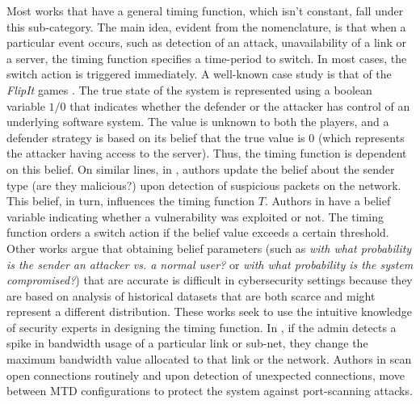Most works that have a general timing function, which isn't constant, fall under this sub-category. The main idea, evident from the nomenclature, is that when a particular event occurs, such as detection of an attack, unavailability of a link or a server, the timing function specifies a time-period to switch. In most cases, the switch action is triggered immediately. 
A well-known case study is that of the \emph{FlipIt} games . The true state of the system is represented using a boolean variable $1/0$ that indicates whether the defender or the attacker has control of an underlying software system. The value is unknown to both the players, and a defender strategy is based on its belief that the true value is $0$ (which represents the attacker having access to the server). Thus, the timing function is dependent on this belief.
On similar lines, in , authors update the belief about the sender type (are they malicious?) upon detection of suspicious packets on the network. This belief, in turn, influences the timing function $T$. Authors in  have a belief variable indicating whether a vulnerability was exploited or not. The timing function orders a switch action if the belief value exceeds a certain threshold.
Other works argue that obtaining belief parameters (such as \textit{with what probability is the sender an attacker vs. a normal user?} or \textit{with what probability is the system compromised?}) that are accurate is difficult in cybersecurity settings because they are based on analysis of historical datasets that are both scarce and might represent a different distribution. These works seek to use the intuitive knowledge of security experts in designing the timing function. In , if the admin detects a spike in bandwidth usage of a particular link or sub-net, they change the maximum bandwidth value allocated to that link or the network. Authors in  scan open connections routinely and upon detection of unexpected connections, move between MTD configurations to protect the system against port-scanning attacks.

